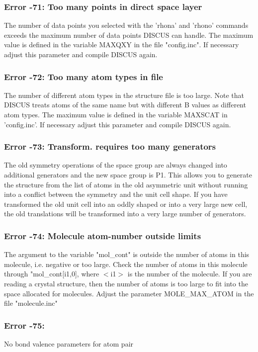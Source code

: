 \subsubsection{Error -71: Too many points in direct space layer}
\par
The number of data points you selected with the 'rhona' and 'rhono' 
commands exceeds the maximum number of data points DISCUS can handle. 
The maximum value is defined in the variable MAXQXY in the file 
"config.inc". If necessary adjust this parameter and compile DISCUS 
again. 
\subsubsection{Error -72: Too many atom types in file}
\par
The number of different atom types in the structure file is too 
large. Note that DISCUS treats atoms of the same name but with 
different B values as different atom types. The maximum value 
is defined in the variable MAXSCAT in 'config.inc'. If necessary 
adjust this parameter and compile DISCUS again. 
\subsubsection{Error -73: Transform. requires too many generators}
\par
The old symmetry operations of the space group are always changed into 
additional generators and the new space group is P1. This allows you 
to generate the structure from the list of atoms in the old asymmetric 
unit without running into a conflict between the symmetry and the 
unit cell shape. 
If you have transformed the old unit cell into an oddly shaped or into 
a very large new cell, the old translations will be transformed into 
a very large number of generators. 
\subsubsection{Error -74: Molecule atom-number outside limits}
\par
The argument to the variable "mol\_cont" is outside the number of 
atoms in this molecule, i.e. negative or too large. 
Check the number of atoms in this molecule through "mol\_cont[i1,0], 
where $ <$i1$> $ is the number of the molecule. 
If you are reading a crystal structure, then the number of atoms is 
too large to fit into the space allocated for molecules. Adjust the 
parameter MOLE\_MAX\_ATOM in the file "molecule.inc" 
\subsubsection{Error -75: }
No bond valence parameters for atom pair 
